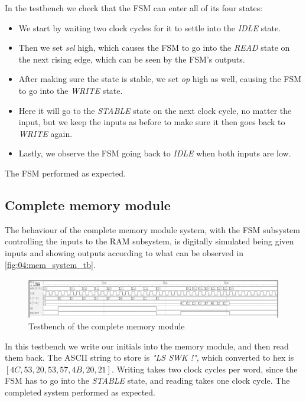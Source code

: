 In the testbench we check that the FSM can enter all of its four states: 

\begin{itemize}
    \item We start by waiting two clock cycles for it to settle into the \textit{IDLE} state. 
    \item Then we set \textit{sel} high, which causes the FSM to go into the \textit{READ} state on the next rising edge, which can be seen by the FSM's outputs. 
    \item After making sure the state is stable, we set \textit{op} high as well, causing the FSM to go into the \textit{WRITE} state. 
    \item Here it will go to the \textit{STABLE} state on the next clock cycle, no matter the input, but we keep the inputs as before to make sure it then goes back to \textit{WRITE} again. 
    \item Lastly, we observe the FSM going back to \textit{IDLE} when both inputs are low.
\end{itemize}
The FSM performed as expected.

\subsection{Complete memory module} \label{sec:04:results:complete_memory_module}
The behaviour of the complete memory module system, with the FSM subsystem controlling the inputs to the RAM subsystem, is digitally simulated being given inputs and showing outputs according to what can be observed in \autoref{fig:04:mem_system_tb}.
\begin{figure}[H]
    \centering
    \includegraphics[width=0.9\linewidth]{LaTeX_2/Figures/mem_system_tb.png}
    \caption{Testbench of the complete memory module}
    \label{fig:04:mem_system_tb}
\end{figure}

In this testbench we write our initials into the memory module, and then read them back. The ASCII string to store is \textit{"LS SWK !"}, which converted to hex is $[4C, 53, 20, 53, 57, 4B, 20, 21]$. Writing takes two clock cycles per word, since the FSM has to go into the \textit{STABLE} state, and reading takes one clock cycle. The completed system performed as expected.